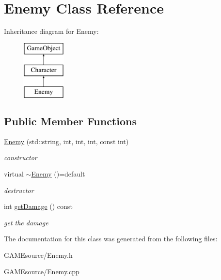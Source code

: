 \hypertarget{class_enemy}{}\section{Enemy Class Reference}
\label{class_enemy}
Inheritance diagram for Enemy\+:\begin{figure}[H]
\begin{center}
\leavevmode
\includegraphics[height=3.000000cm]{class_enemy}
\end{center}
\end{figure}
\subsection*{Public Member Functions}
\begin{DoxyCompactItemize}
\item 
\mbox{\label{class_enemy_af847b3e65f5845b7894bc514ca47174b}} 
\mbox{\hyperlink{class_enemy_af847b3e65f5845b7894bc514ca47174b}{Enemy}} (std\+::string, int, int, int, const int)
\begin{DoxyCompactList}\small\item\em constructor \end{DoxyCompactList}\item 
\mbox{\label{class_enemy_aafb628c66008e33afdd750e2f492bd98}} 
virtual \mbox{\hyperlink{class_enemy_aafb628c66008e33afdd750e2f492bd98}{$\sim$\+Enemy}} ()=default
\begin{DoxyCompactList}\small\item\em destructor \end{DoxyCompactList}\item 
\mbox{\label{class_enemy_abb68708af5f493bee8516d1dce35797e}} 
int \mbox{\hyperlink{class_enemy_abb68708af5f493bee8516d1dce35797e}{get\+Damage}} () const
\begin{DoxyCompactList}\small\item\em get the damage \end{DoxyCompactList}\end{DoxyCompactItemize}


The documentation for this class was generated from the following files\+:\begin{DoxyCompactItemize}
\item 
G\+A\+M\+Esource/Enemy.\+h\item 
G\+A\+M\+Esource/Enemy.\+cpp\end{DoxyCompactItemize}
